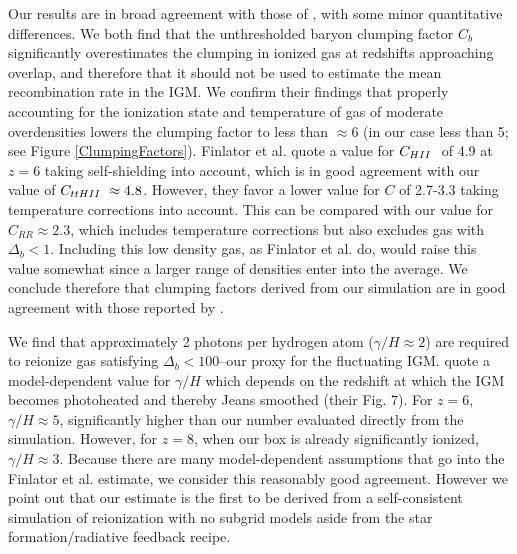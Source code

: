 Our results are in broad agreement with those of \cite{FinlatorEtAl2012}, with some minor quantitative differences.  We both find that the unthresholded baryon clumping factor $C_b$ significantly overestimates the clumping in ionized gas at redshifts approaching overlap, and therefore that it should not be used to estimate the mean recombination rate in the IGM. We confirm their findings that properly accounting for the ionization state and temperature of gas of moderate overdensities lowers the clumping factor to less than $\approx 6$ (in our case less than 5; see Figure \ref{ClumpingFactors}).  Finlator et al. quote a value for $C_{\hii}$ of 4.9 at $z=6$ taking self-shielding into account, which is in good agreement with our value of $C_{tt\hii} \approx 4.8$. However, they favor a lower value for $C$ of 2.7-3.3 taking temperature corrections into account. This can be compared with our value for $C_{RR} \approx 2.3$, which includes temperature corrections but also excludes gas with $\Delta_b<1$. Including this low density gas, as Finlator et al. do, would raise this value somewhat since a larger range of densities enter into the average. We conclude therefore that clumping factors derived from our simulation are in good agreement with those reported by \cite{FinlatorEtAl2012}. 

We find that approximately 2 photons per hydrogen atom ($\gamma/H\approx 2$) are required to reionize gas satisfying $\Delta_b<100$--our proxy for the fluctuating IGM. \cite{FinlatorEtAl2012} quote a model-dependent value for $\gamma/H$ which depends on the redshift at which the IGM becomes photoheated and thereby Jeans smoothed  (their Fig. 7). For $z=6$,  $\gamma/H \approx 5$, significantly higher than our number evaluated directly from the simulation. However, for $z=8$, when our box is already significantly ionized,  $\gamma/H \approx 3$. Because there are many model-dependent assumptions that go into the Finlator et al. estimate, we consider this reasonably good agreement. However we point out that our estimate is the first to be derived from a self-consistent simulation of reionization with no subgrid models aside from the star formation/radiative feedback recipe. 

